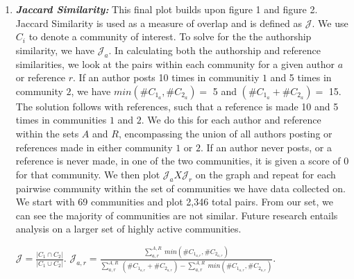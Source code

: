 \documentclass[b0paper,margin=1cm,landscape]{baposter}
\begin{document}
\begin{poster}
{\begin{enumerate}
    \vspace{1em}
    \item \textsl{\textbf{Jaccard Similarity:}}
    \subitem This final plot builds upon figure 1 and figure 2. 
    Jaccard Similarity is used as a measure of overlap and is defined as $ \mathcal{J} $.
    We use $C_i$ to denote a community of interest. 
    To solve for the the authorship similarity, we have $ \mathcal{J}_a $.
    In calculating both the authorship and reference similarities, we look at the pairs within each community for a given author $ a $ or reference $ r $.
    If an author posts 10 times in communitiy $ 1 $ and 5 times in community $ 2 $, we have $ min (\# C_{1_a}, \# C_{2_a}) = $ 5 and $ (\# C_{1_a} + \# C_{2_a}) =$ 15.
    The solution follows with references, such that a reference is made 10 and 5 times in communities $ 1 $ and $ 2 $.
    We do this for each author and reference within the sets $ A $ and $ R $, encompassing the union of all authors posting or references made in either community $1$ or $2$.
    If an author never posts, or a reference is never made, in one of the two communities, it is given a score of 0 for that community. 
    We then plot $ \mathcal{J}_a X \mathcal{J}_r $ on the graph and repeat for each pairwise community within the set of communities we have data collected on. 
    We start with 69 communities and plot 2,346 total pairs. 
    From our set, we can see the majority of communities are not similar. 
    Future research entails analysis on a larger set of highly active communities. 
    \begin{center}
      $ \displaystyle \mathcal{J} = \frac{\vert C_1 \cap C_2 \vert }{\vert C_1 \cup C_2 \vert } $. \vspace{10mm}
      $ \displaystyle \mathcal{J}_{a,r} = \frac{\sum_{a,r}^{A,R} \ min (\# C_{1_{a,r}}, \# C_{2_{a,r}})}{\sum_{a,r}^{A,R} \ (\# C_{1_{a,r}} + \# C_{2_{a,r}}) - \sum_{a,r}^{A,R} \ min (\# C_{1_{a,r}}, \# C_{2_{a,r}})} $. \vspace{10mm}
    \end{center}

  \end{enumerate}

}

\end{poster}
\end{document}
